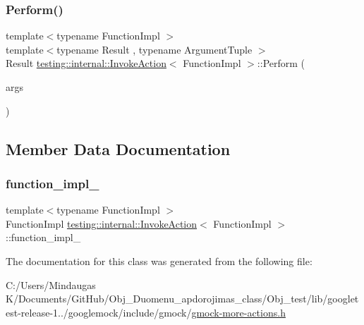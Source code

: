 \mbox{\label{classtesting_1_1internal_1_1_invoke_action_af357ce691795b3520de1fda4ab8af8b2}} 
\subsubsection{\texorpdfstring{Perform()}{Perform()}}
{\footnotesize\ttfamily template$<$typename Function\+Impl $>$ \\
template$<$typename Result , typename Argument\+Tuple $>$ \\
Result \mbox{\hyperlink{classtesting_1_1internal_1_1_invoke_action}{testing\+::internal\+::\+Invoke\+Action}}$<$ Function\+Impl $>$\+::Perform (\begin{DoxyParamCaption}\item[{const Argument\+Tuple \&}]{args }\end{DoxyParamCaption})\hspace{0.3cm}{\ttfamily [inline]}}



\subsection{Member Data Documentation}
\mbox{\label{classtesting_1_1internal_1_1_invoke_action_afe2a9f6157cfd9c8b369987411f53337}} 
\subsubsection{\texorpdfstring{function\_impl\_}{function\_impl\_}}
{\footnotesize\ttfamily template$<$typename Function\+Impl $>$ \\
Function\+Impl \mbox{\hyperlink{classtesting_1_1internal_1_1_invoke_action}{testing\+::internal\+::\+Invoke\+Action}}$<$ Function\+Impl $>$\+::function\+\_\+impl\+\_\+\hspace{0.3cm}{\ttfamily [private]}}



The documentation for this class was generated from the following file\+:\begin{DoxyCompactItemize}
\item 
C\+:/\+Users/\+Mindaugas K/\+Documents/\+Git\+Hub/\+Obj\+\_\+\+Duomenu\+\_\+apdorojimas\+\_\+class/\+Obj\+\_\+test/lib/googletest-\/release-\/1../googlemock/include/gmock/\mbox{\hyperlink{_obj__test_2lib_2googletest-release-1_88_81_2googlemock_2include_2gmock_2gmock-more-actions_8h}{gmock-\/more-\/actions.\+h}}\end{DoxyCompactItemize}
